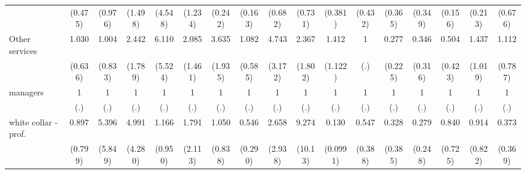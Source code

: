 {\begin{tabular}{l*{16}{c}}
                    &     (0.475)         &     (0.976)         &     (1.498)         &     (4.548)         &     (1.234)         &     (0.242)         &     (0.163)         &     (0.682)         &     (0.731)         &     (0.381)         &     (0.432)         &     (0.365)         &     (0.349)         &     (0.156)         &     (0.213)         &     (0.676)         \\
[1em]
Other services      &       1.030         &       1.004         &       2.442         &       6.110\sym{*}  &       2.085         &       3.635\sym{*}  &       1.082         &       4.743\sym{*}  &       2.367         &       1.412         &           1         &       0.277         &       0.346         &       0.504         &       1.437         &       1.112         \\
                    &     (0.636)         &     (0.833)         &     (1.789)         &     (5.524)         &     (1.461)         &     (1.935)         &     (0.585)         &     (3.172)         &     (1.802)         &     (1.122)         &         (.)         &     (0.225)         &     (0.316)         &     (0.423)         &     (1.019)         &     (0.787)         \\
[1em]
managers            &           1         &           1         &           1         &           1         &           1         &           1         &           1         &           1         &           1         &           1         &           1         &           1         &           1         &           1         &           1         &           1         \\
                    &         (.)         &         (.)         &         (.)         &         (.)         &         (.)         &         (.)         &         (.)         &         (.)         &         (.)         &         (.)         &         (.)         &         (.)         &         (.)         &         (.)         &         (.)         &         (.)         \\
[1em]
white collar - prof.&       0.897         &       5.396         &       4.991         &       1.166         &       1.791         &       1.050         &       0.546         &       2.658         &       9.274\sym{*}  &       0.130\sym{**} &       0.547         &       0.328         &       0.279         &       0.840         &       0.914         &       0.373         \\
                    &     (0.799)         &     (5.849)         &     (4.280)         &     (0.950)         &     (2.113)         &     (0.838)         &     (0.290)         &     (2.938)         &     (10.13)         &    (0.0991)         &     (0.388)         &     (0.385)         &     (0.248)         &     (0.725)         &     (0.822)         &     (0.369)         \\

\end{tabular}}
